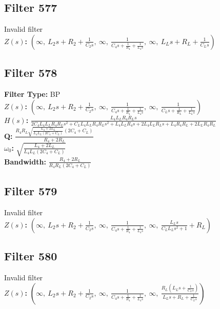 \documentclass{article}
\begin{document}
\subsection*{Filter 577}
Invalid filter \\ 
\textbf{$Z(s)$:} $\left( \infty, \  L_{2} s + R_{2} + \frac{1}{C_{2} s}, \  \infty, \  \frac{1}{C_{4} s + \frac{1}{R_{4}} + \frac{1}{L_{4} s}}, \  \infty, \  L_{L} s + R_{L} + \frac{1}{C_{L} s}\right)$ \\ 
\subsection*{Filter 578}
\textbf{Filter Type:} BP \\ 
\textbf{$Z(s)$:} $\left( \infty, \  L_{2} s + R_{2} + \frac{1}{C_{2} s}, \  \infty, \  \frac{1}{C_{4} s + \frac{1}{R_{4}} + \frac{1}{L_{4} s}}, \  \infty, \  \frac{1}{C_{L} s + \frac{1}{R_{L}} + \frac{1}{L_{L} s}}\right)$ \\ 
\textbf{$H(s)$:} $\frac{L_{4} L_{L} R_{4} R_{L} s}{2 C_{4} L_{4} L_{L} R_{4} R_{L} s^{2} + C_{L} L_{4} L_{L} R_{4} R_{L} s^{2} + L_{4} L_{L} R_{4} s + 2 L_{4} L_{L} R_{L} s + L_{4} R_{4} R_{L} + 2 L_{L} R_{4} R_{L}}$ \\ 
\textbf{Q:} $\frac{R_{4} R_{L} \sqrt{\frac{L_{4} + 2 L_{L}}{L_{4} L_{L} \left(2 C_{4} + C_{L}\right)}} \left(2 C_{4} + C_{L}\right)}{R_{4} + 2 R_{L}}$ \\ 
\textbf{$\omega_0$:} $\sqrt{\frac{L_{4} + 2 L_{L}}{L_{4} L_{L} \left(2 C_{4} + C_{L}\right)}}$ \\ 
\textbf{Bandwidth:} $\frac{R_{4} + 2 R_{L}}{R_{4} R_{L} \left(2 C_{4} + C_{L}\right)}$ \\ 
\subsection*{Filter 579}
Invalid filter \\ 
\textbf{$Z(s)$:} $\left( \infty, \  L_{2} s + R_{2} + \frac{1}{C_{2} s}, \  \infty, \  \frac{1}{C_{4} s + \frac{1}{R_{4}} + \frac{1}{L_{4} s}}, \  \infty, \  \frac{L_{L} s}{C_{L} L_{L} s^{2} + 1} + R_{L}\right)$ \\ 
\subsection*{Filter 580}
Invalid filter \\ 
\textbf{$Z(s)$:} $\left( \infty, \  L_{2} s + R_{2} + \frac{1}{C_{2} s}, \  \infty, \  \frac{1}{C_{4} s + \frac{1}{R_{4}} + \frac{1}{L_{4} s}}, \  \infty, \  \frac{R_{L} \left(L_{L} s + \frac{1}{C_{L} s}\right)}{L_{L} s + R_{L} + \frac{1}{C_{L} s}}\right)$ \\ 
\end{document}
